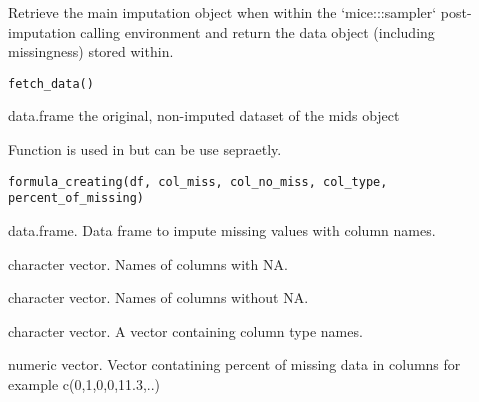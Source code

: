 \documentclass[letterpaper]{book}
\begin{document}
%
\begin{Description}\relax
 Retrieve the main imputation object when within the
`mice:::sampler` post-imputation calling environment
and return the data object (including missingness)
stored within.

\end{Description}
%
\begin{Usage}
\begin{verbatim}
fetch_data()
\end{verbatim}
\end{Usage}
%
\begin{Value}
data.frame
the original, non-imputed dataset of the mids object
\end{Value}
%
\begin{Description}\relax
Function is used in  but can be use sepraetly.
\end{Description}
%
\begin{Usage}
\begin{verbatim}
formula_creating(df, col_miss, col_no_miss, col_type, percent_of_missing)
\end{verbatim}
\end{Usage}
%
\begin{Arguments}
\begin{ldescription}
\item[\code{df}] data.frame. Data frame to impute missing values with column names.

\item[\code{col\_miss}] character vector. Names of columns with NA.

\item[\code{col\_no\_miss}] character vector. Names of columns without NA.

\item[\code{col\_type}] character vector. A vector containing column type names.

\item[\code{percent\_of\_missing}] numeric vector. Vector contatining percent of missing data in columns for example  c(0,1,0,0,11.3,..)
\end{ldescription}
\end{Arguments}
%
\end{document}
